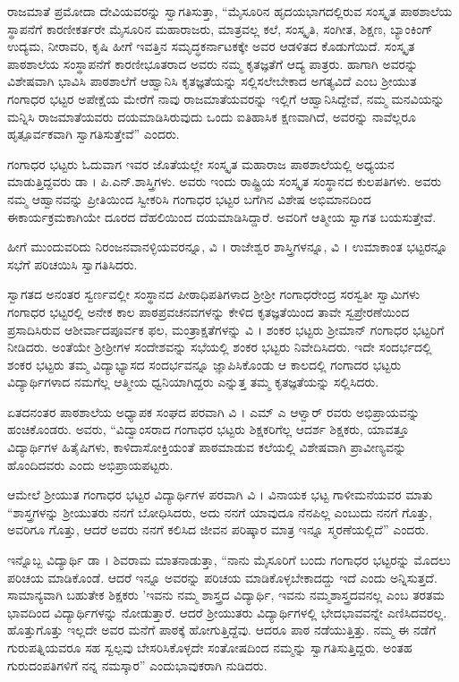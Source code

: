 {ರಾಜಮಾತೆ ಪ್ರಮೋದಾ ದೇವಿಯವರನ್ನು ಸ್ವಾಗತಿಸುತ್ತಾ, “ಮೈಸೂರಿನ ಹೃದಯ\-ಭಾಗದಲ್ಲಿರುವ ಸಂಸ್ಕೃತ ಪಾಠಶಾಲೆಯ ಸ್ಥಾಪನೆಗೆ ಕಾರಣೀಕರ್ತರೇ ಮೈಸೂರಿನ ಮಹಾರಾಜರು, ಮಾತ್ರವಲ್ಲ ಕಲೆ, ಸಂಸ್ಕೃತಿ, ಸಂಗೀತ, ಶಿಕ್ಷಣ, ಬ್ಯಾಂಕಿಂಗ್ ಉದ್ಯಮ, ನೀರಾವರಿ, ಕೃಷಿ ಹೀಗೆ ಇವತ್ತಿನ ಸಮೃದ್ಧಕರ್ನಾಟಕಕ್ಕೇ ಅವರ ಆಡಳಿತದ ಕೊಡುಗೆ\-ಯಿದೆ. ಸಂಸ್ಕೃತ ಪಾಠಶಾಲೆಯ ಸಂಸ್ಥಾಪನೆಗೆ ಕಾರಣೀಭೂತರಾದ ಅವರು ನಮ್ಮ ಕೃತಜ್ಞತೆಗೆ ಆದ್ಯ ಪಾತ್ರರು.  ಹಾಗಾಗಿ ಅವರನ್ನು ವಿಶೇಷವಾಗಿ ಭಾವಿಸಿ ಪಾಠಶಾಲೆಗೆ ಆಹ್ವಾನಿಸಿ ಕೃತಜ್ಞತೆಯನ್ನು ಸಲ್ಲಿಸಲೇಬೇಕಾದ ಅಗತ್ಯವಿದೆ ಎಂಬ ಶ್ರೀಯುತ ಗಂಗಾಧರ ಭಟ್ಟರ ಅಪೇಕ್ಷೆಯ ಮೇರೆಗೆ ನಾವು ರಾಜಮಾತೆಯವರನ್ನು ಇಲ್ಲಿಗೆ ಆಹ್ವಾನಿಸಿದ್ದೇವೆ, ನಮ್ಮ ಮನವಿಯನ್ನು ಮನ್ನಿಸಿ ರಾಜಮಾತೆಯವರು ದಯಮಾಡಿಸಿರುವುದು ಒಂದು ಐತಿಹಾಸಿಕ ಕ್ಷಣವಾಗಿದೆ, ಅವರನ್ನು ನಾವೆಲ್ಲರೂ ಹೃತ್ಪೂರ್ವಕವಾಗಿ ಸ್ವಾಗತಿಸುತ್ತೇವೆ” ಎಂದರು.

ಗಂಗಾಧರ ಭಟ್ಟರು ಓದುವಾಗ ಇವರ ಜೊತೆಯಲ್ಲೇ ಸಂಸ್ಕೃತ ಮಹಾರಾಜ ಪಾಠಶಾಲೆಯಲ್ಲಿ ಅಧ್ಯಯನ ಮಾಡುತ್ತಿದ್ದವರು ಡಾ । ಪಿ.ಎನ್.ಶಾಸ್ತ್ರಿಗಳು. ಅವರು ಇಂದು ರಾಷ್ಟ್ರಿಯ ಸಂಸ್ಕೃತ ಸಂಸ್ಥಾನದ ಕುಲಪತಿಗಳು. ಅವರು ನಮ್ಮ ಆಹ್ವಾನವನ್ನು ಪ್ರೀತಿಯಿಂದ ಸ್ವೀಕರಿಸಿ ಗಂಗಾಧರ ಭಟ್ಟರ ಬಗೆಗಿನ ವಿಶೇಷ ಅಭಿಮಾನದಿಂದ ಈ\break ಕಾರ್ಯಕ್ರಮಕಾಗಿಯೇ ದೂರದ ದೆಹಲಿಯಿಂದ ದಯಮಾಡಿಸಿದ್ದಾರೆ. ಅವರಿಗೆ ಆತ್ಮೀಯ ಸ್ವಾಗತ ಬಯಸುತ್ತೇವೆ.

ಹೀಗೆ ಮುಂದುವರಿದು ನಿರಂಜನವಾನಳ್ಳಿಯವರನ್ನೂ, ವಿ । ರಾಜೇಶ್ವರ ಶಾಸ್ತ್ರಿ\-ಗಳನ್ನೂ, ವಿ । ಉಮಾಕಾಂತ ಭಟ್ಟರನ್ನೂ ಸಭೆಗೆ ಪರಿಚಯಿಸಿ ಸ್ವಾಗತಿಸಿದರು.

ಸ್ವಾಗತದ  ಅನಂತರ ಸ್ವರ್ಣವಲ್ಲೀ ಸಂಸ್ಥಾನದ ಪೀಠಾಧಿಪತಿಗಳಾದ ಶ್ರೀಶ್ರೀ ಗಂಗಾಧರೇಂದ್ರ ಸರಸ್ವತೀ ಸ್ವಾಮಿಗಳು  ಗಂಗಾಧರ ಭಟ್ಟರಲ್ಲಿ ಅನೇಕ ಕಾಲ ಪಾಠ\-ಪ್ರವಚನವಗಳನ್ನು ಕೇಳಿದ ಕೃತಜ್ಞತೆಯಿಂದ ತಾವೇ ಸ್ವಪ್ರೇರಣೆಯಿಂದ ಪ್ರಸಾದಿಸಿರುವ ಆಶೀರ್ವಾದಪೂರ್ವಕ ಫಲ, ಮಂತ್ರಾಕ್ಷತೆಗಳನ್ನು ವಿ । ಶಂಕರ ಭಟ್ಟರು ಶ್ರೀಮಾನ್ ಗಂಗಾಧರ ಭಟ್ಟರಿಗೆ ನೀಡಿದರು. ಅಂತೆಯೇ ಶ್ರೀಶ್ರೀಗಳ ಸಂದೇಶವನ್ನು ಸಭೆಯಲ್ಲಿ ಶಂಕರ ಭಟ್ಟರು ನಿವೇದಿಸಿದರು. ಇದೇ ಸಂದರ್ಭದಲ್ಲಿ ಶಂಕರ ಭಟ್ಟರು ತಮ್ಮ ವಿದ್ಯಾಭ್ಯಾಸದ ಸಂದರ್ಭವನ್ನೂ ಜ್ಞಾಪಿಸಿಕೊಂಡು ಆ ಕಾಲದಲ್ಲಿ ಗಂಗಾದರ ಭಟ್ಟರು ವಿದ್ಯಾರ್ಥಿಗಳಾದ ನಮಗೆಲ್ಲ ಆತ್ಮೀಯ ಧ್ವನಿಯಾಗಿದ್ದರು ಎನ್ನುತ್ತ ತಮ್ಮ ಕೃತಜ್ಞತೆಯನ್ನು ಸಲ್ಲಿಸಿದರು.

ಏತದನಂತರ ಪಾಠಶಾಲೆಯ ಅಧ್ಯಾಪಕ ಸಂಘದ ಪರವಾಗಿ ವಿ । ಎಮ್ ಎ ಆಳ್ವಾರ್ ರವರು ಅಭಿಪ್ರಾಯವನ್ನು ಹಂಚಿಕೊಂಡರು. ಅವರು, “ವಿದ್ವಾಂಸರಾದ ಗಂಗಾಧರ ಭಟ್ಟರು ಶಿಕ್ಷಕರಿಗೆಲ್ಲ ಆದರ್ಶ ಶಿಕ್ಷಕರು, ಯಾವತ್ತೂ ವಿದ್ಯಾರ್ಥಿಗಳ ಹಿತೈಷಿಗಳು, ಕಾಳಿದಾಸೋಕ್ತಿಯಂತೆ ಪಾಠಮಾಡುವ ಕಲೆಯಲ್ಲಿ ವಿಶೇಷವಾಗಿ ಪ್ರಾವೀಣ್ಯವನ್ನು ಹೊಂದಿದವರು ಎಂದು ಅಭಿಪ್ರಾಯಪಟ್ಟರು.

ಆಮೇಲೆ ಶ್ರೀಯುತ ಗಂಗಾಧರ ಭಟ್ಟರ ವಿದ್ಯಾರ್ಥಿಗಳ ಪರವಾಗಿ ವಿ । ವಿನಾಯಕ ಭಟ್ಟ ಗಾಳೀಮನೆಯವರ ಮಾತು \enginline{-} “ಶಾಸ್ತ್ರಗಳನ್ನು ಶ್ರೀಯುತರು ನನಗೆ ಬೋಧಿ\-ಸಿದರು, ಅದು ನನಗೆ ಯಾವುದೂ ನೆನಪಿಲ್ಲ ಎಂಬುದು ನನಗೆ ಗೊತ್ತು, ಅವರಿಗೂ ಗೊತ್ತು, ಆದರೆ ಅವರು ನನಗೆ ಕಲಿಸಿದ ಜೀವನ ಪರಿಷ್ಕಾರ ಮಾತ್ರ ಇನ್ನೂ ಸ್ಮರಣೆಯಲ್ಲಿದೆ” ಎಂದರು. 

ಇನ್ನೊಬ್ಬ ವಿದ್ಯಾರ್ಥಿ ಡಾ । ಶಿವರಾಮ ಮಾತನಾಡುತ್ತಾ, “ನಾನು ಮೈಸೂರಿಗೆ ಬಂದು ಗಂಗಾಧರ ಭಟ್ಟರನ್ನು ಮೊದಲು ಪರಿಚಯ ಮಾಡಿಕೊಂಡೆ. ಆದರೆ ಇನ್ನೂ ಅವರನ್ನು ಪರಿಚಯ ಮಾಡಿಕೊಳ್ಳಬೇಕಾದದ್ದು ಇದೆ ಎಂದು ಅನ್ನಿಸುತ್ತದೆ. ಸಾಮಾನ್ಯ\-ವಾಗಿ ಬಹುತೇಕ ಶಿಕ್ಷಕರು ’ಇವನು ನಮ್ಮ ಶಾಸ್ತ್ರದ ವಿದ್ಯಾರ್ಥಿ, ಇವನು ನಮ್ಮ\-ಶಾಸ್ತ್ರದವನಲ್ಲ ಎಂಬ ತರತಮ ಭಾವದಿಂದ ವಿದ್ಯಾರ್ಥಿಗಳನ್ನು ನೋಡುತ್ತಾರೆ. ಆದರೆ ಶ್ರೀಯುತರು ವಿದ್ಯಾರ್ಥಿಗಳಲ್ಲಿ ಭೇದಭಾವವನ್ನೇ ಎಣಿಸಿದವರಲ್ಲ. ಹೊತ್ತುಗೊತ್ತು ಇಲ್ಲದೇ ಅವರ ಮನೆಗೆ ಪಾಠಕ್ಕೆ ಹೋಗುತ್ತಿದ್ದೆವು. ಆದರೂ ಪಾಠ ನಡೆಯುತ್ತಿತ್ತು. ನಮ್ಮ ಈ ನಡೆಗೆ ಗುರುಪತ್ನಿಯವರೂ ಸಹ ಸ್ವಲ್ಪವು ಬೇಸರಿಸಿಕೊಳ್ಳದೇ ಸಂತೋಷದಿಂದ ನಮ್ಮನ್ನು ಸ್ವಾಗತಿಸುತ್ತಿದ್ದರು. ಅಂತಹ ಗುರುದಂಪತಿಗಳಿಗೆ ನನ್ನ ನಮಸ್ಕಾರ” ಎಂದು\break ಭಾವುಕರಾಗಿ ನುಡಿದರು.

}
